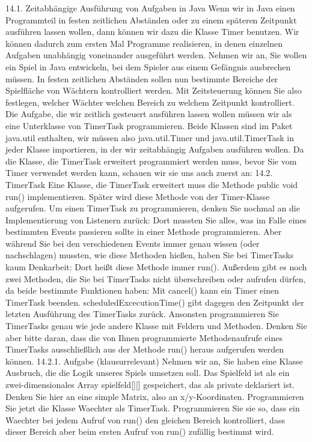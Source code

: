 14.1.	Zeitabhängige Ausführung von Aufgaben in Java
Wenn wir in Java einen Programmteil in festen zeitlichen Abständen oder zu einem späteren Zeitpunkt ausführen lassen wollen, dann können wir dazu die Klasse Timer benutzen. Wir können dadurch zum ersten Mal Programme realisieren, in denen einzelnen Aufgaben unabhängig voneinander ausgeführt werden. Nehmen wir an, Sie wollen ein Spiel in Java entwickeln, bei dem Spieler aus einem Gefängnis ausbrechen müssen. In festen zeitlichen Abständen sollen nun bestimmte Bereiche der Spielfläche von Wächtern kontrolliert werden. Mit Zeitsteuerung können Sie also festlegen, welcher Wächter welchen Bereich zu welchem Zeitpunkt kontrolliert.
Die Aufgabe, die wir zeitlich gesteuert ausführen lassen wollen müssen wir als eine Unterklasse von TimerTask programmieren.
Beide Klassen sind im Paket java.util enthalten, wir müssen also java.util.Timer und java.util.TimerTask in jeder Klasse importieren, in der wir zeitabhängig Aufgaben ausführen wollen.
Da die Klasse, die TimerTask erweitert programmiert werden muss, bevor Sie vom Timer verwendet werden kann, schauen wir sie uns auch zuerst an:
14.2.	TimerTask
Eine Klasse, die TimerTask erweitert muss die Methode public void run() implementieren. Später wird diese Methode von der Timer-Klasse aufgerufen. Um einen TimerTask zu programmieren, denken Sie nochmal an die Implementierung von Listenern zurück: Dort mussten Sie alles, was im Falle eines bestimmten Events passieren sollte in einer Methode programmieren. Aber während Sie bei den verschiedenen Events immer genau wissen (oder nachschlagen) mussten, wie diese Methoden hießen, haben Sie bei TimerTasks kaum Denkarbeit: Dort heißt diese Methode immer run().
Außerdem gibt es noch zwei Methoden, die Sie bei TimerTasks nicht überschreiben oder aufrufen dürfen, da beide bestimmte Funktionen haben: Mit cancel() kann ein Timer einen TimerTask beenden. scheduledExcecutionTime() gibt dagegen den Zeitpunkt der letzten Ausführung des TimerTasks zurück. 
Ansonsten programmieren Sie TimerTasks genau wie jede andere Klasse mit Feldern und Methoden. Denken Sie aber bitte daran, dass die von Ihnen programmierte Methodenaufrufe eines TimerTasks ausschließlich aus der Methode run() heraus aufgerufen werden können.
14.2.1.	Aufgabe (klausurrelevant)
Nehmen wir an, Sie haben eine Klasse Ausbruch, die die Logik unseres Spiels umsetzen soll. Das Spielfeld ist als ein zwei-dimensionales Array spielfeld[][] gespeichert, das als private deklariert ist. Denken Sie hier an eine simple Matrix, also an x/y-Koordinaten.
Programmieren Sie jetzt die Klasse Waechter als TimerTask. Programmieren Sie sie so, dass ein Waechter bei jedem Aufruf von run() den gleichen Bereich kontrolliert, dass dieser Bereich aber beim ersten Aufruf von run() zufällig bestimmt wird. 
